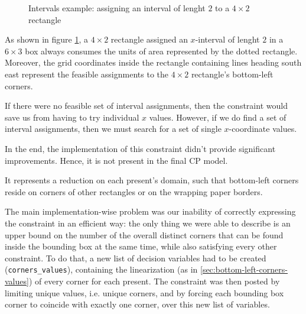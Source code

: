 \documentclass[a4paper,10pt]{article}
\newcounter{subsubsubsection}[subsubsection]
\begin{document}
\begin{figure}[h]
   \centering
   \caption{Intervals example: assigning an interval of lenght $2$ to a $4\times2$ rectangle}
   \label{fig:intervals}
\end{figure}

As shown in figure \ref{fig:intervals}, a $4\times2$ rectangle assigned an $x$-interval of lenght $2$ in a $6\times3$ box always consumes the units of area represented by the dotted rectangle. 
Moreover, the grid coordinates inside the rectangle containing lines heading south east represent the feasible assignments to the $4\times2$ rectangle's bottom-left corners.

If there were no feasible set of interval assignments, then the constraint would save us from having to try individual $x$ values. However, if we do find a set of interval assignments, then we must search for a set of single $x$-coordinate values.

In the end, the implementation of this constraint didn't provide significant improvements. Hence, it is not present in the final CP model.

 \label{sec:anchor-points-v1}
It represents a reduction on each present's domain, such that bottom-left corners reside on corners of other rectangles or on the wrapping paper borders.

The main implementation-wise problem was our inability of correctly expressing the constraint in an efficient way: the only thing we were able to describe is an upper bound on the number of the overall distinct corners that can be found inside the bounding box at the same time, while also satisfying every other constraint.
To do that, a new list of decision variables had to be created (\texttt{corners\_values}), containing the linearization (as in \ref{sec:bottom-left-corners-values}) of every corner for each present. 
The constraint was then posted by limiting unique values, i.e. unique corners, and by forcing each bounding box corner to coincide with exactly one corner, over this new list of variables.
\end{document}

